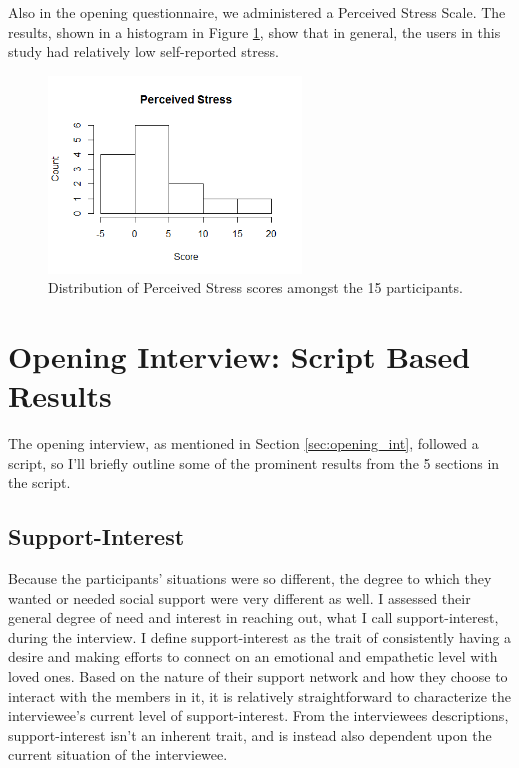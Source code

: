   Also in the opening questionnaire, we administered a Perceived Stress Scale.
  The results, shown in a histogram in Figure \ref{fig:perceived_stress},
  show that in general, the users in this study had relatively low
  self-reported stress.

    \begin{figure}
    \centering
    \includegraphics[width=0.6\textwidth]{perceived_stress.png}
    \caption[Perceived Stress]{
      Distribution of Perceived Stress scores amongst the 15 participants.
    }
    \label{fig:perceived_stress}
    \end{figure}

\section{Opening Interview: Script Based Results}
  The opening interview, as mentioned in Section \ref{sec:opening_int},
  followed a script, so I'll briefly outline some of the
  prominent results from the 5 sections in the script.

  \subsection{Support-Interest}
  Because the participants' situations were so different,
  the degree to which they wanted or needed social support were very different as well.
  I assessed their general degree of need and interest in reaching out,
  what I call support-interest, during the interview.
  I define support-interest as the trait of consistently having a desire
  and making efforts to
  connect on an emotional and empathetic level with loved ones.
  Based on the nature of their support network
  and how they choose to interact with the members in it,
  it is relatively straightforward to characterize the interviewee's
  current level of support-interest.
  From the interviewees descriptions, support-interest isn't an inherent trait,
  and is instead also dependent upon the current situation of the interviewee.

